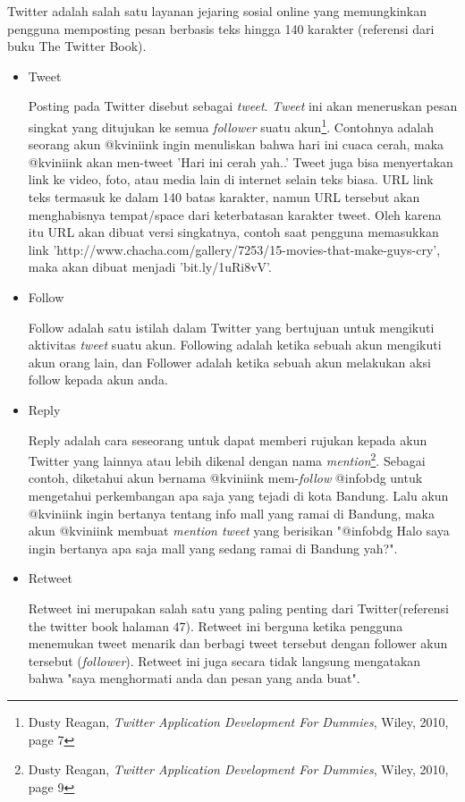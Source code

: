 Twitter adalah salah satu layanan jejaring sosial online yang memungkinkan pengguna memposting pesan berbasis teks hingga 140 karakter (referensi dari buku The Twitter Book).
\begin{itemize}
	\item Tweet 
	
	Posting pada Twitter disebut sebagai \textit{tweet}. \textit{Tweet} ini akan meneruskan pesan singkat yang ditujukan ke semua \textit{follower} suatu akun\footnote{Dusty Reagan, \textit{Twitter Application Development For Dummies}, Wiley, 2010, page 7}. Contohnya adalah seorang akun @kviniink ingin menuliskan bahwa hari ini cuaca cerah, maka @kviniink akan men-tweet 'Hari ini cerah yah..' Tweet juga bisa menyertakan link ke video, foto, atau media lain di internet selain teks biasa. URL link teks termasuk ke dalam 140 batas karakter, namun URL tersebut akan menghabisnya tempat/space dari keterbatasan karakter tweet. Oleh karena itu URL akan dibuat versi singkatnya, contoh saat pengguna memasukkan link 'http://www.chacha.com/gallery/7253/15-movies-that-make-guys-cry', maka akan dibuat menjadi 'bit.ly/1uRi8vV'.
	\item Follow
	
	Follow adalah satu istilah dalam Twitter yang bertujuan untuk mengikuti aktivitas \textit{tweet} suatu akun. Following adalah ketika sebuah akun mengikuti akun orang lain, dan Follower adalah ketika sebuah akun melakukan aksi follow kepada akun anda.
	\item Reply 
	
	Reply adalah cara seseorang untuk dapat memberi rujukan kepada akun Twitter yang lainnya atau lebih dikenal dengan nama \textit{mention}\footnote{Dusty Reagan, \textit{Twitter Application Development For Dummies}, Wiley, 2010, page 9}. Sebagai contoh, diketahui akun bernama @kviniink mem-\textit{follow} @infobdg untuk mengetahui perkembangan apa saja yang tejadi di kota Bandung. Lalu akun @kviniink ingin bertanya tentang info mall yang ramai di Bandung, maka akun @kviniink membuat \textit{mention tweet} yang berisikan "@infobdg Halo saya ingin bertanya apa saja mall yang sedang ramai di Bandung yah?".
	\item Retweet
	
	Retweet ini merupakan salah satu yang paling penting dari Twitter(referensi the twitter book halaman 47). Retweet ini berguna ketika pengguna menemukan tweet menarik dan berbagi tweet tersebut dengan follower akun tersebut (\textit{follower}). Retweet ini juga secara tidak langsung mengatakan bahwa "saya menghormati anda dan pesan yang anda buat".
	

\end{itemize}
